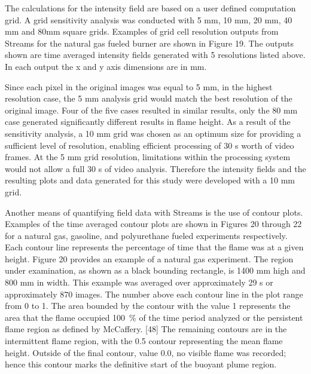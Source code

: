 \documentclass[twoside]{uocthesis}
\begin{document}
{The calculations for the intensity field are based on a user defined computation grid.  A grid sensitivity analysis was conducted with 5 mm, 10 mm, 20 mm, 40 mm and 80mm square grids.  Examples of grid cell resolution outputs from Streams for the natural gas fueled burner are shown in Figure 19.  The outputs shown are time averaged intensity fields generated with 5 resolutions listed above. In each output the x and y axis dimensions are in mm.

Since each pixel in the original images was equal to 5 mm, in the highest resolution case, the 5 mm analysis grid would match the best resolution of the original image.  Four of the five cases resulted in similar results, only the 80 mm case generated significantly different results in flame height.  As a result of the sensitivity analysis, a 10 mm grid was chosen as an optimum size for providing a sufficient level of resolution, enabling efficient processing of 30 s worth of video frames.  At the 5 mm grid resolution, limitations within the processing system would not allow a full 30 s of video analysis.  Therefore the intensity fields and the resulting plots and data generated for this study were developed with a 10 mm grid.

Another means of quantifying field data with Streams is the use of contour plots.  Examples of the time averaged contour plots are shown in Figures 20 through 22 for a natural gas, gasoline, and polyurethane fueled experiments respectively.  Each contour line represents the percentage of time that the flame was at a given height.  Figure 20 provides an example of a natural gas experiment.  The region under examination, as shown as a black bounding rectangle, is 1400 mm high and 800 mm in width.  This example was averaged over approximately 29 s or approximately 870 images.  The number above each contour line in the plot range from 0 to 1.  The area bounded by the contour with the value 1 represents the area that the flame occupied 100~\% of the time period analyzed or the persistent flame region as defined by McCaffery. [48] The remaining contours are in the intermittent flame region, with the 0.5 contour representing the mean flame height. Outside of the final contour, value 0.0, no visible flame was recorded; hence this contour marks the definitive start of the buoyant plume region.  

}
\end{document}
